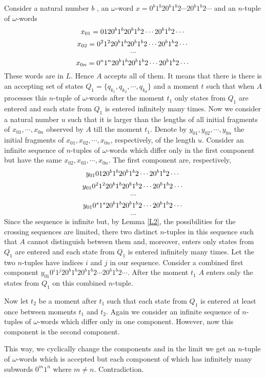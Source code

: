 \documentclass{llncs}
\begin{document}
Consider a natural number $b$ , an $\omega $-word $x = 0^b1^b20^b1^b2\cdots 20^b1^b2\cdots $ and an $n$-tuple of $\omega $-words
$$
x_{01} = 0120^b1^b20^b1^b2\cdots 20^b1^b2\cdots \\
$$
$$
x_{02} = 0^21^220^b1^b20^b1^b2\cdots 20^b1^b2\cdots \\
$$
$$
\cdots
$$
$$
x_{0n} = 0^n1^n20^b1^b20^b1^b2\cdots 20^b1^b2\cdots \\
$$
These words are in $L$. Hence $A$ accepts all of them. It means that there is there is an accepting set of states $Q_1 = \{q_{k_1}, q_{k_2}, \cdots , q_{k_d}\}$
and a moment $t$ such that when $A$ processes this $n$-tuple of $\omega $-words after the moment $t_1$ only states from $Q_1$ are entered and each state from 
$Q_1$ is entered infinitely many times. Now we consider a natural number $u$ such that it is larger than the lengths of all initial fragments of $x_{01}, \cdots , x_{0n}$ observed by $A$ till the moment $t_1$. Denote by $y_{01}, y_{02}, \cdots , y_{0n}$ the initial fragments of $x_{01}, x_{02}, \cdots , x_{0n}$, respectively,
of the length $u$. Consider an infinite sequence of $n$-tuples of $\omega $-words which differ only in the first component but have the same $x_{02}, x_{03}, \cdots , x_{0n}$. The first component are, respectively,
$$
y_{01}0120^b1^b20^b1^b2\cdots 20^b1^b2\cdots \\
$$
$$
y_{01}0^21^220^b1^b20^b1^b2\cdots 20^b1^b2\cdots \\
$$
$$
\cdots
$$
$$
y_{01}0^s1^s20^b1^b20^b1^b2\cdots 20^b1^b2\cdots \\
$$
$$
\cdots
$$
Since the sequence is infinite but, by Lemma \ref{L2}, the possibilities for the crossing sequences are limited, there two distinct $n$-tuples in this sequence 
such that $A$ cannot distinguish between them and, moreover, enters only states from $Q_1$ are entered and each state from 
$Q_1$ is entered infinitely many times. Let the two $n$-tuples have indices $i$ and $j$ in our sequence. Consider a combined first component
$y_{01}0^i1^j20^b1^b20^b1^b2\cdots 20^b1^b2\cdots $. After the moment $t_1$ $A$ enters only the states from $Q_1$ on this combined $n$-tuple.

Now let $t_2$ be a moment after $t_1$ such that each state from 
$Q_1$ is entered at least once between moments $t_1$ and $t_2$. Again we consider an infinite sequence of $n$-tuples of $\omega $-words which differ only in one  component. However, now this component is the second component. 

This way, we cyclically change the components and in the limit we get an $n$-tuple of $\omega $-words which is accepted but each component of which has infinitely many subwords $0^m1^n$ where $m\neq n$. Contradiction.
\end{document}
